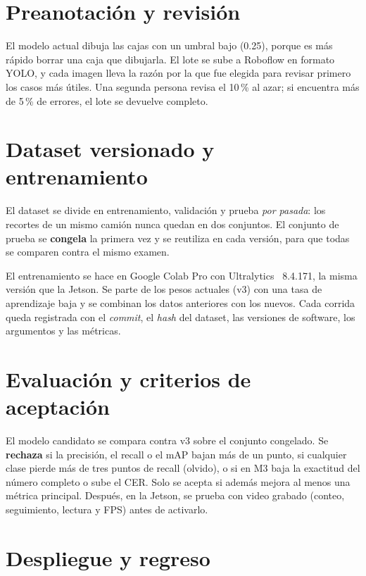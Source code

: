 \section{Preanotación y revisión}

El modelo actual dibuja las cajas con un umbral bajo (0.25), porque es
más rápido borrar una caja que dibujarla. El lote se sube a Roboflow en
formato YOLO, y cada imagen lleva la razón por la que fue elegida para
revisar primero los casos más útiles. Una segunda persona revisa el
10\,\% al azar; si encuentra más de 5\,\% de errores, el lote se devuelve
completo.

\section{Dataset versionado y entrenamiento}

El dataset se divide en entrenamiento, validación y prueba \emph{por
pasada}: los recortes de un mismo camión nunca quedan en dos conjuntos.
El conjunto de prueba se \textbf{congela} la primera vez y se reutiliza
en cada versión, para que todas se comparen contra el mismo examen.

El entrenamiento se hace en Google Colab Pro con
Ultralytics~\cite{ultralytics} 8.4.171, la misma versión que la Jetson.
Se parte de los pesos actuales (v3) con una tasa de aprendizaje baja y
se combinan los datos anteriores con los nuevos. Cada corrida queda
registrada con el \emph{commit}, el \emph{hash} del dataset, las
versiones de software, los argumentos y las métricas.

\section{Evaluación y criterios de aceptación}

El modelo candidato se compara contra v3 sobre el conjunto congelado.
Se \textbf{rechaza} si la precisión, el recall o el mAP bajan más de un
punto, si cualquier clase pierde más de tres puntos de recall (olvido),
o si en M3 baja la exactitud del número completo o sube el CER. Solo se
acepta si además mejora al menos una métrica principal. Después, en la
Jetson, se prueba con video grabado (conteo, seguimiento, lectura y
FPS) antes de activarlo.

\section{Despliegue y regreso}

